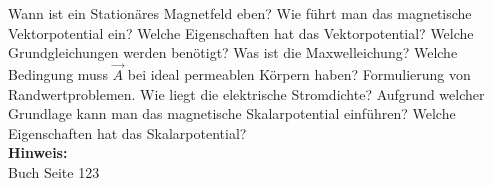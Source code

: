 \begin{question}[section=3,subsection=34,name={Stationäre Ebene magnetische Felder},difficulty=4,type=mdl,mode=exm,tags={}]
	Wann ist ein Stationäres Magnetfeld eben? Wie führt man das magnetische Vektorpotential ein? Welche Eigenschaften hat das Vektorpotential? Welche Grundgleichungen werden benötigt? Was ist die Maxwelleichung? Welche Bedingung muss $\vec A$ bei ideal permeablen Körpern haben? Formulierung von Randwertproblemen. Wie liegt die elektrische Stromdichte? Aufgrund welcher Grundlage kann man das magnetische Skalarpotential einführen? Welche Eigenschaften hat das Skalarpotential?
	\\ \textbf{Hinweis:}\\
	Buch Seite 123
\end{question}
\begin{solution}
	
\end{solution}